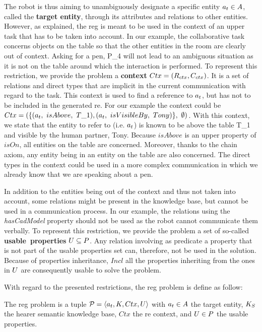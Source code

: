The robot is thus aiming to unambiguously designate a specific entity $a_t \in A$, called the \textbf{target entity}, through its attributes and relations to other entities. However, as explained, the \acrshort{reg} is meant to be used in the context of an upper task that has to be taken into account. In our example, the collaborative task concerns objects on the table so that the other entities in the room are clearly out of context. Asking for a pen, P\_4 will not lead to an ambiguous situation as it is not on the table around which the interaction is performed. To represent this restriction, we provide the problem a \textbf{context} $Ctx = (R_{ctx}, C_{ctx})$. It is a set of relations and direct types that are implicit in the current communication with regard to the task. This context is used to find a reference to $a_t$, but has not to be included in the generated \acrshort{re}. For our example the context could be $Ctx = (\{ (\goalindiv,\ isAbove,\ T\_1), (\goalindiv,\ isVisibleBy,\ Tony) \},\ \emptyset)$. With this context, we state that the entity to refer to (i.e. $a_t$) is known to be above the table T\_1 and visible by the human partner, Tony. Because $isAbove$ is an upper property of $isOn$, all entities on the table are concerned. Moreover, thanks to the chain axiom, any entity being in an entity on the table are also concerned. The direct types in the context could be used in a more complex communication in which we already know that we are speaking about a pen.

In addition to the entities being out of the context and thus not taken into account, some relations might be present in the knowledge base, but cannot be used in a communication process. In our example, the relations using the \textit{hasCadModel} property should not be used as the robot cannot communicate them verbally. To represent this restriction, we provide the problem a set of so-called \mbox{\textbf{usable properties}} $U \subseteq P$. Any relation involving as predicate a property that is not part of the usable properties set can, therefore, not be used in the solution. Because of properties inheritance, $Incl$ all the properties inheriting from the ones in $U$ are consequently usable to solve the problem. 


With regard to the presented restrictions, the \acrshort{reg} problem is define as follow:

\begin{definition}
The \acrshort{reg} problem is a tuple $\mathcal{P} = \langle a_t, K, Ctx, U \rangle$ with $a_t \in A$ the target entity, $K_S$ the hearer semantic knowledge base, $Ctx$ the \acrshort{re} context, and $U \in P$ the usable properties.
\end{definition}

